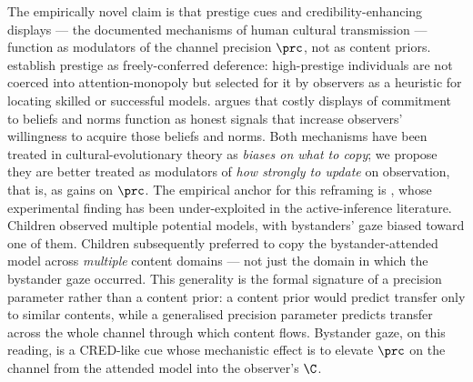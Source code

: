 The empirically novel claim is that prestige cues and credibility-enhancing
displays --- the documented mechanisms of human cultural transmission ---
function as modulators of the channel precision $\prc$, not as content
priors. \citet{henrichGilWhite2001Prestige} establish prestige as
freely-conferred deference: high-prestige individuals are not coerced into
attention-monopoly but selected for it by observers as a heuristic for
locating skilled or successful models. \citet{henrich2009CREDs} argues that
costly displays of commitment to beliefs and norms function as honest signals
that increase observers' willingness to acquire those beliefs and norms.
Both mechanisms have been treated in cultural-evolutionary theory as
\emph{biases on what to copy}; we propose they are better treated as
modulators of \emph{how strongly to update} on observation, that is, as gains
on $\prc$. The empirical anchor for this reframing is
\citet{chudek2012BystanderGaze}, whose experimental finding has been
under-exploited in the active-inference literature. Children observed
multiple potential models, with bystanders' gaze biased toward one of them.
Children subsequently preferred to copy the bystander-attended model across
\emph{multiple} content domains --- not just the domain in which the
bystander gaze occurred. This generality is the formal signature of a
precision parameter rather than a content prior: a content prior would
predict transfer only to similar contents, while a generalised precision
parameter predicts transfer across the whole channel through which content
flows. Bystander gaze, on this reading, is a CRED-like cue whose mechanistic
effect is to elevate $\prc$ on the channel from the attended model into the
observer's $\C$.

